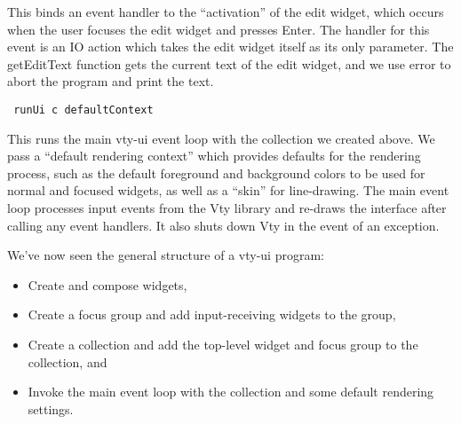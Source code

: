 This binds an event handler to the “activation” of the edit widget,
which occurs when the user focuses the edit widget and presses Enter.
The handler for this event is an IO action which takes the edit widget
itself as its only parameter.  The getEditText function gets the current
text of the edit widget, and we use error to abort the program and print
the text.

\begin{verbatim}
 runUi c defaultContext
\end{verbatim}

This runs the main vty-ui event loop with the collection we created
above.  We pass a “default rendering context” which provides defaults
for the rendering process, such as the default foreground and background
colors to be used for normal and focused widgets, as well as a “skin”
for line-drawing.  The main event loop processes input events from the
Vty library and re-draws the interface after calling any event handlers.
It also shuts down Vty in the event of an exception.

We've now seen the general structure of a vty-ui program:
\begin{itemize}
\item Create and compose widgets,
\item Create a focus group and add input-receiving widgets to the group,
\item Create a collection and add the top-level widget and focus group
      to the collection, and
\item Invoke the main event loop with the collection and some default
      rendering settings.
\end{itemize}
